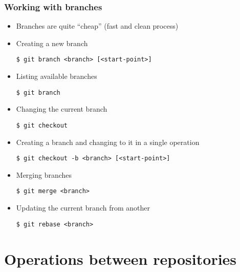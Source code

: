 \begin{frame}[fragile]
  \frametitle{Working with branches}

  \begin{itemize}
  \item Branches are quite ``cheap'' (fast and clean process)
  \item Creating a new branch
    {\scriptsize
\begin{verbatim}
$ git branch <branch> [<start-point>]
\end{verbatim}
    }

  \item Listing available branches
    {\scriptsize
\begin{verbatim}
$ git branch
\end{verbatim}
    }

  \item Changing the current branch
    {\scriptsize
\begin{verbatim}
$ git checkout
\end{verbatim}
    }

  \item Creating a branch and changing to it in a single operation
    {\scriptsize
\begin{verbatim}
$ git checkout -b <branch> [<start-point>]
\end{verbatim}
    }      

  \item Merging branches
    {\scriptsize
\begin{verbatim}
$ git merge <branch>
\end{verbatim} 
    }

  \item Updating the current branch from another
    {\scriptsize
\begin{verbatim}
$ git rebase <branch>
\end{verbatim}
    }
  \end{itemize}
\end{frame}

\section{Operations between repositories}

